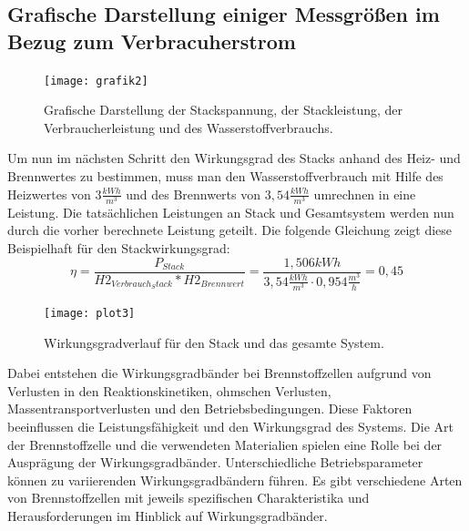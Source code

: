 \subsection{Grafische Darstellung einiger Messgrößen im Bezug zum Verbracuherstrom}
\begin{figure}[H]
    \centering
    \texttt{[image: grafik2]}
    \caption{Grafische Darstellung der Stackspannung, der
    Stackleistung, der Verbraucherleistung und des Wasserstoffverbrauchs.}
    \label{fig:plot2_26062023}
  \end{figure}
  Um nun im nächsten Schritt den Wirkungsgrad des Stacks anhand des Heiz- und Brennwertes zu bestimmen, muss man den Wasserstoffverbrauch mit Hilfe des Heizwertes von $3 \frac{kWh}{m^3}$ und des Brennwerts von $3,54 \frac{kWh}{m^3}$ umrechnen in eine Leistung. Die tatsächlichen Leistungen an Stack und Gesamtsystem werden nun durch die vorher berechnete Leistung geteilt. Die folgende Gleichung zeigt diese Beispielhaft für den Stackwirkungsgrad:
\begin{equation}
 \eta= \frac{P_{Stack}}{H2_{Verbrauch_Stack}*H2_{Brennwert}}= \frac{1,506 kWh}{3,54 \frac{kWh}{m^3 }\cdot 0,954 \frac{m^3}{h}}=0,45
  \label{eq:230627_Beispiel_wirkungsgrad_Berechnung}
\end{equation}
\begin{figure}[H]
    \centering
    \texttt{[image: plot3]}
    \caption{Wirkungsgradverlauf für den Stack und das gesamte System.}
    \label{fig:plot3_26062023}
  \end{figure}
  Dabei entstehen die Wirkungsgradbänder bei Brennstoffzellen aufgrund von Verlusten in den Reaktionskinetiken, ohmschen Verlusten, Massentransportverlusten und den Betriebsbedingungen. Diese Faktoren beeinflussen die Leistungsfähigkeit und den Wirkungsgrad des Systems.
   Die Art der Brennstoffzelle und die verwendeten Materialien spielen eine Rolle bei der Ausprägung der Wirkungsgradbänder. Unterschiedliche Betriebsparameter können zu variierenden Wirkungsgradbändern führen. Es gibt verschiedene Arten von Brennstoffzellen mit jeweils spezifischen Charakteristika und Herausforderungen im Hinblick auf Wirkungsgradbänder.
